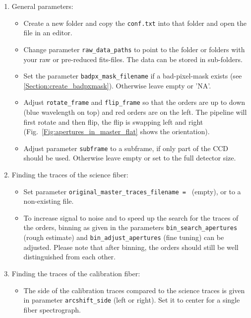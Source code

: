 \documentclass[10pt,a4paper]{article}
\begin{document}
\begin{enumerate}
  \item General parameters: \vspace*{-\itemsep}
  \begin{itemize}[leftmargin=*]\setlength\itemsep{0em}
    \item Create a new folder and copy the \verb|conf.txt| into that folder and open the file in an editor.
    \item Change parameter \verb|raw_data_paths| to point to the folder or folders with your raw or pre-reduced fits-files. The data can be stored in sub-folders.
    \item Set the parameter \verb|badpx_mask_filename| if a bad-pixel-mask exists (see \ref{Section:create_badpxmask}). Otherwise leave empty or 'NA'.
    \item Adjust \verb|rotate_frame| and \verb|flip_frame| so that the orders are up to down (blue wavelength on top) and red orders are on the left. The pipeline will first rotate and then flip, the flip is swapping left and right (Fig.~\ref{Fig:apertures_in_master_flat} shows the orientation).
    \item Adjust parameter \verb|subframe| to a subframe, if only part of the CCD should be used. Otherwise leave empty or set to the full detector size.
  \end{itemize}
 
  \item Finding the traces of the science fiber: \vspace*{-\itemsep}
  \begin{itemize}[leftmargin=*]\setlength\itemsep{0em}
    \item Set parameter \verb|original_master_traces_filename = | (empty), or to a non-existing file.
    \item To increase signal to noise and to speed up the search for the traces of the orders, binning as given in the parameters \verb|bin_search_apertures| (rough estimate) and \verb|bin_adjust_apertures| (fine tuning) can be adjusted. Please note that after binning, the orders should still be well distinguished from each other. %
  \end{itemize}
  
  \item Finding the traces of the calibration fiber: \vspace*{-\itemsep}
  \begin{itemize}[leftmargin=*]\setlength\itemsep{0em}
    \item The side of the calibration traces compared to the science traces is given in parameter \verb|arcshift_side| (left or right). Set it to center for a single fiber spectrograph.
  \end{itemize}
  

\end{enumerate}
\end{document}
